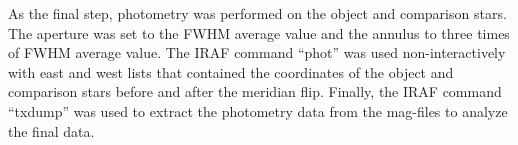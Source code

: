 \noindent As the final step, photometry was performed on the object and comparison stars. 
The aperture was set to the FWHM average value and the annulus to three times of 
FWHM average value. The IRAF command “phot” was used non-interactively with east 
and west lists that contained the coordinates of the object and comparison stars 
before and after the meridian flip. Finally, the IRAF command “txdump” was used to 
extract the photometry data from the mag-files to analyze the final data. 
